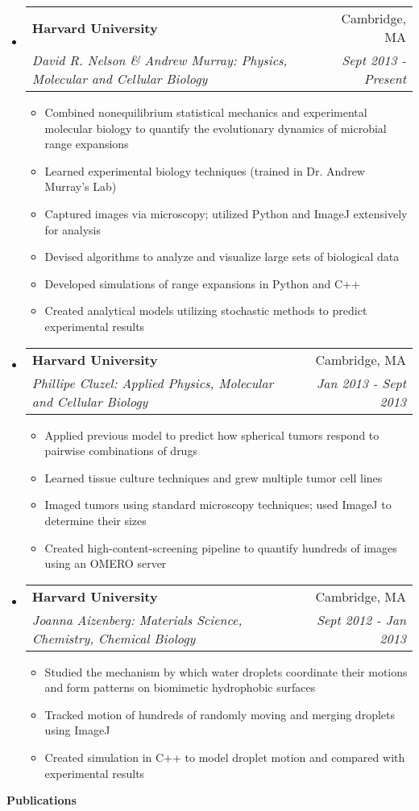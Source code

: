 \documentclass[letterpaper,11pt]{article}
\makeatletter
\newcommand{\resitem}[1]{\item #1 \vspace{-2pt}}
\newcommand{\resheading}[1]
{
	\vspace{2pt}
	\phantomsection
	\addcontentsline{toc}{section}{#1}
	{\large \colorbox{mygrey}{
	\begin{minipage}{\textwidth}{
		\textbf{#1 \vphantom{p\^{E}}}}
	\end{minipage}}
	}
	\vspace{-9pt}
}
\newcommand{\ressubheading}[4]{\vspace{-14pt}
\begin{tabular*}{7.0in}{l@{\extracolsep{\fill}}r}
		\\
		\textbf{#1} & #2 \\
		\textit{#3} & \textit{#4} \\
\end{tabular*}\vspace{-6pt}}
\makeatother
\begin{document}
\begin{itemize}

\item
	\ressubheading{Harvard University}{Cambridge, MA}{David R. Nelson \& Andrew Murray: Physics, Molecular and Cellular Biology}{Sept 2013 - Present}
\begin{itemize}
	\resitem{Combined nonequilibrium statistical mechanics and experimental molecular biology to quantify the evolutionary dynamics of microbial range expansions}
	\resitem{Learned experimental biology techniques (trained in Dr. Andrew Murray's Lab)}
	\resitem{Captured images via microscopy; utilized Python and ImageJ extensively for analysis}
	\resitem{Devised algorithms to analyze and visualize large sets of biological data}
	\resitem{Developed simulations of range expansions in Python and C++}
	\resitem{Created analytical models utilizing stochastic methods to predict experimental results}
\end{itemize}

\item
	\ressubheading{Harvard University}{Cambridge, MA}{Phillipe Cluzel: Applied Physics, Molecular and Cellular Biology }{Jan 2013 - Sept 2013}
\begin{itemize}
	\resitem{Applied previous model to predict how spherical tumors respond to pairwise combinations of drugs}
	\resitem{Learned tissue culture techniques and grew multiple tumor cell lines}
	\resitem{Imaged tumors using standard microscopy techniques; used ImageJ to determine their sizes}
	\resitem{Created high-content-screening pipeline to quantify hundreds of images using an OMERO server}
\end{itemize}

\item
	\ressubheading{Harvard University}{Cambridge, MA}{Joanna Aizenberg: Materials Science, Chemistry, Chemical Biology}{Sept 2012 - Jan 2013}
\begin{itemize}
	\resitem{Studied the mechanism by which water droplets coordinate their motions and form patterns on biomimetic hydrophobic surfaces}
	\resitem{Tracked motion of hundreds of randomly moving and merging droplets using ImageJ}
	\resitem{Created simulation in C++ to model droplet motion and compared with experimental results}
\end{itemize}

\end{itemize}

\resheading{Publications}
\end{document}

